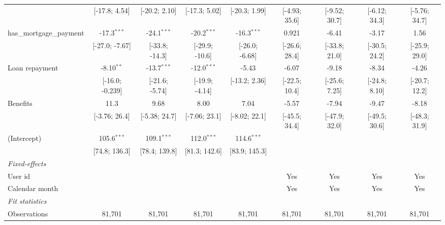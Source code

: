 \begin{table}[htbp]
\begin{threeparttable}[b]
\begin{tabular}{lcccccccc}
                                  & [-17.8; 4.54]   & [-20.2; 2.10]   & [-17.3; 5.02]   & [-20.3; 1.99]   & [-4.93; 35.6]   & [-9.52; 30.7]   & [-6.12; 34.3]   & [-5.76; 34.7]\\   
         has\_mortgage\_payment   & -17.3$^{***}$   & -24.1$^{***}$   & -20.2$^{***}$   & -16.3$^{***}$   & 0.921           & -6.41           & -3.17           & 1.56\\   
                                  & [-27.0; -7.67]  & [-33.8; -14.3]  & [-29.9; -10.6]  & [-26.0; -6.68]  & [-26.6; 28.4]   & [-33.8; 21.0]   & [-30.5; 24.2]   & [-25.9; 29.0]\\   
         Loan repayment           & -8.10$^{**}$    & -13.7$^{***}$   & -12.0$^{***}$   & -5.43           & -6.07           & -9.18           & -8.34           & -4.26\\   
                                  & [-16.0; -0.239] & [-21.6; -5.74]  & [-19.9; -4.14]  & [-13.2; 2.36]   & [-22.5; 10.4]   & [-25.6; 7.25]   & [-24.8; 8.10]   & [-20.7; 12.2]\\   
         Benefits                 & 11.3            & 9.68            & 8.00            & 7.04            & -5.57           & -7.94           & -9.47           & -8.18\\   
                                  & [-3.76; 26.4]   & [-5.38; 24.7]   & [-7.06; 23.1]   & [-8.02; 22.1]   & [-45.5; 34.4]   & [-47.9; 32.0]   & [-49.5; 30.6]   & [-48.3; 31.9]\\   
         (Intercept)              & 105.6$^{***}$   & 109.1$^{***}$   & 112.0$^{***}$   & 114.6$^{***}$   &                 &                 &                 &   \\   
                                  & [74.8; 136.3]   & [78.4; 139.8]   & [81.3; 142.6]   & [83.9; 145.3]   &                 &                 &                 &   \\   
         \midrule
         \emph{Fixed-effects}\\
         User id                  &                 &                 &                 &                 & Yes             & Yes             & Yes             & Yes\\  
         Calendar month           &                 &                 &                 &                 & Yes             & Yes             & Yes             & Yes\\  
         \midrule
         \emph{Fit statistics}\\
         Observations             & 81,701          & 81,701          & 81,701          & 81,701          & 81,701          & 81,701          & 81,701          & 81,701\\  

\end{tabular}
\end{threeparttable}
\end{table}
